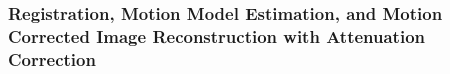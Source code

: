             \subsubsection{Registration, Motion Model Estimation, and Motion Corrected Image Reconstruction with Attenuation Correction} \label{sec:evaluation_of_pet_ct_motion_correction_incorporating_motion_models_using_mlacf_and_complex_gating_schemes_methods_registration_motion_model_estimation_and_motion_corrected_image_reconstruction_with_attenuation_correction}
                
                
                

